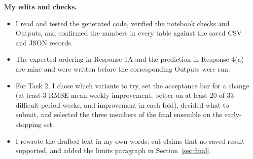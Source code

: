 \textbf{My edits and checks.}
\begin{itemize}
  \item I read and tested the generated code, verified the notebook checks and Outputs, and
        confirmed the numbers in every table against the saved CSV and JSON records.
  \item The expected ordering in Response 1A and the prediction in Response 4(a) are mine
        and were written before the corresponding Outputs were run.
  \item For Task 2, I chose which variants to try, set the acceptance bar for a change
        (at least 3 RMSE mean weekly improvement, better on at least 20 of 33
        difficult-period weeks, and improvement in each fold), decided what to submit, and
        selected the three members of the final ensemble on the early-stopping set.
  \item I rewrote the drafted text in my own words, cut claims that no saved result
        supported, and added the limits paragraph in Section~\ref{sec:final}.
\end{itemize}

